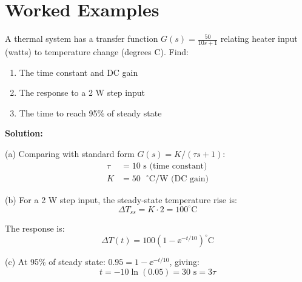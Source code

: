 \section{Worked Examples}
\label{sec:examples}

\begin{examplebox}[title=Example 7.1: First-Order Thermal System]
A thermal system has a transfer function $G(s) = \frac{50}{10s + 1}$ relating heater input (watts) to temperature change (degrees C). Find:
\begin{enumerate}[label=(\alph*)]
    \item The time constant and DC gain
    \item The response to a 2 W step input
    \item The time to reach 95\% of steady state
\end{enumerate}

\textbf{Solution:}

(a) Comparing with standard form $G(s) = K/(\tau s + 1)$:
\begin{align}
\tau &= 10 \text{ s (time constant)} \\
K &= 50 \text{ }^\circ\text{C/W (DC gain)}
\end{align}

(b) For a 2 W step input, the steady-state temperature rise is:
\begin{equation}
\Delta T_{ss} = K \cdot 2 = 100^\circ\text{C}
\end{equation}

The response is:
\begin{equation}
\Delta T(t) = 100(1 - \ee^{-t/10})^\circ\text{C}
\end{equation}

(c) At 95\% of steady state: $0.95 = 1 - \ee^{-t/10}$, giving:
\begin{equation}
t = -10\ln(0.05) = 30 \text{ s} = 3\tau
\end{equation}
\end{examplebox}


